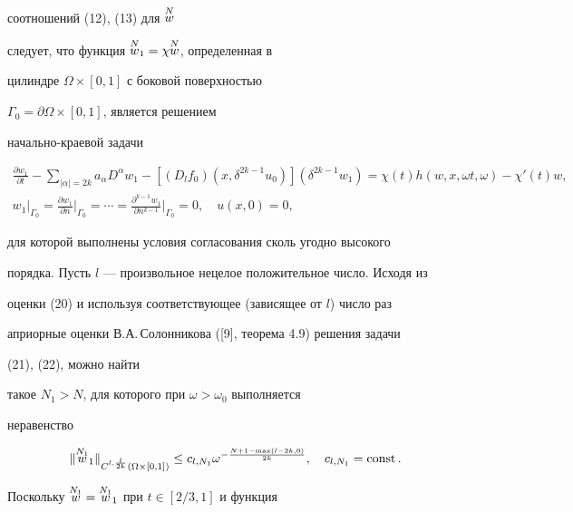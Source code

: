 соотношений (12), (13) для $\overset{N}{w}{}$ 


следует, что функция $\overset{N}{w}{}_1=\chi\overset{N}{w}{}$, определенная в 


цилиндре $\Omega\times[0,1]$ с боковой поверхностью


$\Gamma_0=\partial\Omega\times[0,1]$, является решением  


начально-краевой задачи 


\begin{gather} 


\frac{\partial w_1}{\partial t}-\sum_{|\alpha|=2k} 


a_\alpha D^\alpha w_1-[(D_l f_0)(x,\delta^{2k-1}u_0)] 


(\delta^{2k-1}w_1)=\chi(t)h(w,x,\omega t,\omega)- 


\chi'(t)w, \\ 


% 


w_1|_{\Gamma_0}=\frac{\partial w_1}{\partial n} 


\bigg|_{\Gamma_0}=\dotsb= 


\frac{\partial^{k-1}w_1}{\partial n^{k-1}}\bigg|_{\Gamma_0}=0, 


\quad u(x,0)=0, 


\end{gather} 


для которой выполнены условия согласования сколь угодно высокого 


порядка. Пусть $l$ --- произвольное нецелое положительное число. Исходя из 


оценки (20) и используя соответствующее (зависящее от $l$) число раз


априорные оценки В.А.\,Солонникова ([9], теорема 4.9) решения задачи


(21), (22), можно найти 


такое $N_1>N$, для которого при $\omega>\omega_0$ выполняется 


неравенство 


$$ 


\|\up{N_1}{w}_1\|_{C^{l,\frac{l}{2k}}(\Omega\times[0,1])}\le 


c_{l,N_1}\omega^{-\frac{N+1-\max(l-2k,0)}{2k}},\quad 


c_{l,N_1}=\const. 


$$ 


 


Поскольку $\overset{N_1}{w}{}=\overset{N_1}{w}{}_1$ при $t\in[2/3,1]$ и функция 


